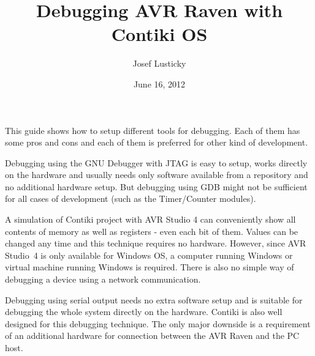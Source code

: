 \documentclass{article}
\begin{document}
\title{Debugging AVR Raven with Contiki OS}
\author{Josef Lusticky}
\date{June 16, 2012}

\maketitle

This guide shows how to setup different tools for debugging.
Each of them has some pros and cons and each of them is preferred for other kind of development.

Debugging using the GNU Debugger with JTAG is easy to setup, works directly on the hardware
and usually needs only software available from a repository and no additional hardware setup.
But debugging using GDB might not be sufficient for all cases of development (such as the Timer/Counter modules).

A simulation of Contiki project with AVR Studio 4 can conveniently show all contents of memory
as well as registers - even each bit of them.
Values can be changed any time and this technique requires no hardware.
However, since AVR Studio~4 is only available for Windows OS,
a computer running Windows or virtual machine running Windows is required.
There is also no simple way of debugging a device using a network communication.

Debugging using serial output needs no extra software setup and is suitable
for debugging the whole system directly on the hardware.
Contiki is also well designed for this debugging technique.
The only major downside is a requirement of an additional hardware
for connection between the AVR Raven and the PC host.

\end{document}
